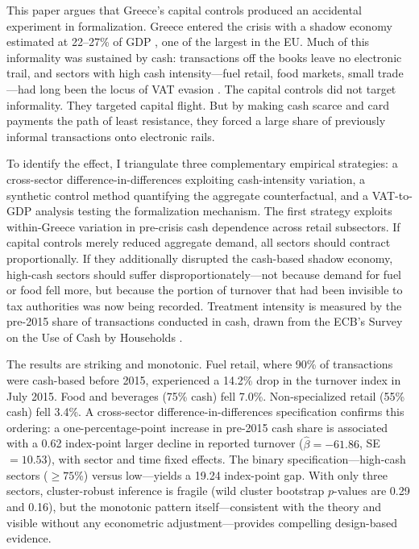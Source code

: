 \documentclass[12pt]{article}
\begin{document}
This paper argues that Greece's capital controls produced an accidental experiment in formalization. Greece entered the crisis with a shadow economy estimated at 22--27\% of GDP \citep{medina2018shadow, schneider2010new}, one of the largest in the EU. Much of this informality was sustained by cash: transactions off the books leave no electronic trail, and sectors with high cash intensity---fuel retail, food markets, small trade---had long been the locus of VAT evasion \citep{ecvat2019}. The capital controls did not target informality. They targeted capital flight. But by making cash scarce and card payments the path of least resistance, they forced a large share of previously informal transactions onto electronic rails.

To identify the effect, I triangulate three complementary empirical strategies: a cross-sector difference-in-differences exploiting cash-intensity variation, a synthetic control method quantifying the aggregate counterfactual, and a VAT-to-GDP analysis testing the formalization mechanism. The first strategy exploits within-Greece variation in pre-crisis cash dependence across retail subsectors. If capital controls merely reduced aggregate demand, all sectors should contract proportionally. If they additionally disrupted the cash-based shadow economy, high-cash sectors should suffer disproportionately---not because demand for fuel or food fell more, but because the portion of turnover that had been invisible to tax authorities was now being recorded. Treatment intensity is measured by the pre-2015 share of transactions conducted in cash, drawn from the ECB's Survey on the Use of Cash by Households \citep{ecvat2019}.

The results are striking and monotonic. Fuel retail, where 90\% of transactions were cash-based before 2015, experienced a 14.2\% drop in the turnover index in July 2015. Food and beverages (75\% cash) fell 7.0\%. Non-specialized retail (55\% cash) fell 3.4\%. A cross-sector difference-in-differences specification confirms this ordering: a one-percentage-point increase in pre-2015 cash share is associated with a 0.62 index-point larger decline in reported turnover ($\hat{\beta} = -61.86$, SE $= 10.53$), with sector and time fixed effects. The binary specification---high-cash sectors ($\geq 75$\%) versus low---yields a 19.24 index-point gap. With only three sectors, cluster-robust inference is fragile (wild cluster bootstrap $p$-values are 0.29 and 0.16), but the monotonic pattern itself---consistent with the theory and visible without any econometric adjustment---provides compelling design-based evidence.
\end{document}
